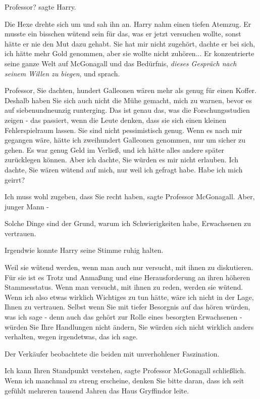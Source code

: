 \glqq Professor?\grqq{} sagte Harry.

Die Hexe drehte sich um und sah ihn an. Harry nahm einen tiefen Atemzug. Er
musste ein bisschen wütend sein für das, was er jetzt versuchen wollte, sonst
hätte er nie den Mut dazu gehabt. Sie hat mir nicht zugehört, dachte er bei
sich, ich hätte mehr Gold genommen, aber sie wollte nicht zuhören... Er
konzentrierte seine ganze Welt auf McGonagall und das Bedürfnis, \emph{dieses
Gespräch nach seinem Willen zu biegen}, und sprach.

\glqq Professor, Sie dachten, hundert Galleonen wären mehr als genug für einen
Koffer. Deshalb haben Sie sich auch nicht die Mühe gemacht, mich zu warnen,
bevor es auf siebenundneunzig runterging. Das ist genau das, was die
Forschungsstudien zeigen - das passiert, wenn die Leute denken, dass sie sich
einen kleinen Fehlerspielraum lassen. Sie sind nicht pessimistisch genug. Wenn
es nach mir gegangen wäre, hätte ich zweihundert Galleonen genommen, nur um
sicher zu gehen. Es war genug Geld im Verließ, und ich hätte alles andere später
zurücklegen können. Aber ich dachte, Sie würden es mir nicht erlauben. Ich
dachte, Sie wären wütend auf mich, nur weil ich gefragt habe. Habe ich mich
geirrt?\grqq{}

\glqq Ich muss wohl zugeben, dass Sie recht haben\grqq{}, sagte Professor
McGonagall. \glqq Aber, junger Mann -\grqq{}

\glqq Solche Dinge sind der Grund, warum ich Schwierigkeiten habe, Erwachsenen
zu vertrauen.\grqq{}

Irgendwie konnte Harry seine Stimme ruhig halten.

\glqq Weil sie wütend werden, wenn man auch nur versucht, mit ihnen zu
diskutieren. Für sie ist es Trotz und Anmaßung und eine Herausforderung an ihren
höheren Stammesstatus. Wenn man versucht, mit ihnen zu reden, werden sie wütend.
Wenn ich also etwas wirklich Wichtiges zu tun hätte, wäre ich nicht in der Lage,
Ihnen zu vertrauen. Selbst wenn Sie mit tiefer Besorgnis auf das hören würden,
was ich sage - denn auch das gehört zur Rolle eines besorgten Erwachsenen -
würden Sie Ihre Handlungen nicht ändern, Sie würden sich nicht wirklich anders
verhalten, wegen irgendetwas, das ich sage.\grqq{}

Der Verkäufer beobachtete die beiden mit unverhohlener Faszination.

\glqq Ich kann Ihren Standpunkt verstehen\grqq{}, sagte Professor McGonagall
schließlich. \glqq Wenn ich manchmal zu streng erscheine, denken Sie bitte
daran, dass ich seit gefühlt mehreren tausend Jahren das Haus Gryffindor
leite.\grqq{}

